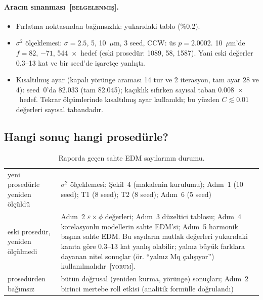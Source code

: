 \documentclass[11pt,a4paper]{article}
\newcommand{\BEL}{\textsc{[belgelenmiş]}}
\newcommand{\YOR}{\textsc{[yorum]}}
\begin{document}
\paragraph{Aracın sınanması~\BEL.}
\begin{itemize}
\item Fırlatma noktasından bağımsızlık: yukarıdaki tablo (\%0.2).
\item $\sigma^2$ ölçeklemesi: $\sigma=2.5$, 5, 10~$\mu$m, 3 seed, CCW: üs $p=2.0002$. 10~$\mu$m'de
$f=82$, $-71$, 544~$\times$~hedef (eski prosedür: 1089, 58, 1587). Yani eski değerler 0.3--13 kat ve bir
seed'de işaretçe yanlıştı.
\item Kısaltılmış ayar (kapalı yörünge araması 14 tur ve 2 iterasyon, tam ayar 28 ve 4): seed~0'da 82.033
(tam 82.045); kaçıklık sıfırken sayısal taban 0.008~$\times$~hedef. Tekrar ölçümlerinde kısaltılmış ayar
kullanıldı; bu yüzden $C\lesssim0.01$ değerleri sayısal tabandadır.
\end{itemize}

\subsection{Hangi sonuç hangi prosedürle?}
\begin{table}[H]\centering\small
\caption{Raporda geçen sahte EDM sayılarının durumu.}\label{tab:hangisi}
\begin{tabularx}{\textwidth}{lX}
\toprule
yeni prosedürle yeniden ölçüldü & $\sigma^2$ ölçeklemesi; Şekil~4 (makalenin kurulumu); Adım~1 (10 seed);
T1 (8 seed); T2 (8 seed); Adım~6 (5 seed) \\
\addlinespace
eski prosedür, yeniden ölçülmedi & Adım~2 $\varepsilon\times\phi$ değerleri; Adım~3 düzeltici tablosu;
Adım~4 korelasyonlu modellerin sahte EDM'si; Adım~5 harmonik başına sahte EDM. Bu sayıların mutlak
değerleri yukarıdaki kanıta göre 0.3--13 kat yanlış olabilir; yalnız büyük farklara dayanan nitel
sonuçlar (ör. ``yalnız Mq çalışıyor'') kullanılmalıdır~\YOR. \\
\addlinespace
prosedürden bağımsız & bütün doğrusal (yeniden kurma, yörünge) sonuçları; Adım~2 birinci mertebe roll
etkisi (analitik formülle doğrulandı) \\
\bottomrule
\end{tabularx}
\end{table}
\end{document}
